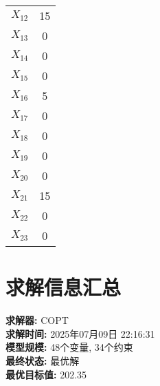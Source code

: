 \documentclass[a4paper,10pt]{article}
\begin{document}
\begin{center}
\begin{longtable}{cc}
$X_{12}$ & 15 \\
$X_{13}$ & 0 \\
$X_{14}$ & 0 \\
$X_{15}$ & 0 \\
$X_{16}$ & 5 \\
$X_{17}$ & 0 \\
$X_{18}$ & 0 \\
$X_{19}$ & 0 \\
$X_{20}$ & 0 \\
$X_{21}$ & 15 \\
$X_{22}$ & 0 \\
$X_{23}$ & 0 \\
\end{longtable}
\end{center}

\section{求解信息汇总}

\textbf{求解器:} COPT \\
\textbf{求解时间:} 2025年07月09日 22:16:31 \\
\textbf{模型规模:} 48个变量, 34个约束 \\
\textbf{最终状态:} 最优解 \\
\textbf{最优目标值:} 202.35
\end{document}
